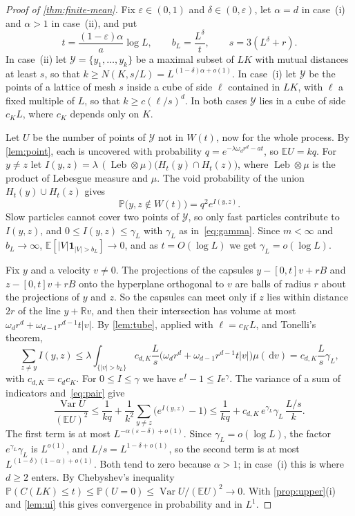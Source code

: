 \documentclass[11pt,a4paper]{article}
\numberwithin{equation}{section}
\theoremstyle{definition}
\theoremstyle{remark}
\newcommand{\E}{\mathbb E}
\newcommand{\Pp}{\mathbb P}
\newcommand{\R}{\mathbb R}
\newcommand{\ind}{\mathbf 1}
\newcommand{\dd}{\,\mathrm d}
\newcommand{\Leb}{\operatorname{Leb}}
\newcommand{\abs}[1]{\lvert#1\rvert}
\begin{document}
\begin{proof}[Proof of \cref{thm:finite-mean}]
Fix $\varepsilon\in(0,1)$ and $\delta\in(0,\varepsilon)$, let $\alpha=d$ in
case~(i) and $\alpha>1$ in case~(ii), and put
\[
t=\frac{(1-\varepsilon)\alpha}{a}\log L,\qquad b_L=\frac{L^\delta}{t},\qquad
s=3(L^\delta+r).
\]
In case~(ii) let $\mathcal Y=\{y_1,\dots,y_k\}$ be a maximal subset of $LK$
with mutual distances at least $s$, so that
$k\ge N(K,s/L)=L^{(1-\delta)\alpha+o(1)}$. In case~(i) let $\mathcal Y$ be the
points of a lattice of mesh $s$ inside a cube of side $\ell$ contained in
$LK$, with $\ell$ a fixed multiple of $L$, so that $k\ge c(\ell/s)^d$. In
both cases $\mathcal Y$ lies in a cube of side $c_KL$, where $c_K$ depends
only on $K$.

Let $U$ be the number of points of $\mathcal Y$ not in $W(t)$, now for the
whole process. By \cref{lem:point}, each is uncovered with probability
$q=e^{-\lambda\omega_dr^d-at}$, so $\E U=kq$. For $y\ne z$ let
$I(y,z)=\lambda\,(\Leb\otimes\mu)\bigl(H_t(y)\cap H_t(z)\bigr)$, where
$\Leb\otimes\mu$ is the product of Lebesgue measure and $\mu$. The void
probability of the union $H_t(y)\cup H_t(z)$ gives
\begin{equation}\label{eq:pair}
\Pp\bigl(y,z\notin W(t)\bigr)=q^2e^{I(y,z)}.
\end{equation}
Slow particles cannot cover two points of $\mathcal Y$, so only fast particles
contribute to $I(y,z)$, and $0\le I(y,z)\le\gamma_L$ with $\gamma_L$ as
in~\eqref{eq:gamma}. Since $m<\infty$ and $b_L\to\infty$,
$\E[\abs V\ind_{\abs V>b_L}]\to0$, and as $t=O(\log L)$ we get
$\gamma_L=o(\log L)$.

Fix $y$ and a velocity $v\ne0$. The projections of the capsules
$y-[0,t]v+rB$ and $z-[0,t]v+rB$ onto the hyperplane orthogonal to $v$ are
balls of radius $r$ about the projections of $y$ and $z$. So the capsules can
meet only if $z$ lies within distance $2r$ of the line $y+\R v$, and then
their intersection has volume at most $\omega_dr^d+\omega_{d-1}r^{d-1}t\abs v$.
By \cref{lem:tube}, applied with $\ell=c_KL$, and Tonelli's theorem,
\[
\sum_{z\ne y}I(y,z)\le\lambda\int_{\{\abs v>b_L\}}c_{d,K}\frac{L}{s}
\bigl(\omega_dr^d+\omega_{d-1}r^{d-1}t\abs v\bigr)\mu(\dd v)
=c_{d,K}\frac{L}{s}\gamma_L,
\]
with $c_{d,K}=c_dc_K$. For $0\le I\le\gamma$ we have $e^I-1\le Ie^\gamma$.
The variance of a sum of indicators and~\eqref{eq:pair} give
\[
\frac{\operatorname{Var}U}{(\E U)^2}
\le\frac1{kq}+\frac1{k^2}\sum_{y\ne z}\bigl(e^{I(y,z)}-1\bigr)
\le\frac1{kq}+c_{d,K}\,e^{\gamma_L}\gamma_L\,\frac{L/s}{k}.
\]
The first term is at most $L^{-\alpha(\varepsilon-\delta)+o(1)}$. Since
$\gamma_L=o(\log L)$, the factor $e^{\gamma_L}\gamma_L$ is $L^{o(1)}$, and
$L/s=L^{1-\delta+o(1)}$, so the second term is at most
$L^{(1-\delta)(1-\alpha)+o(1)}$. Both tend to zero because $\alpha>1$; in
case~(i) this is where $d\ge2$ enters. By Chebyshev's inequality
$\Pp(C(LK)\le t)\le\Pp(U=0)\le\operatorname{Var}U/(\E U)^2\to0$. With
\cref{prop:upper}(i) and \cref{lem:ui} this gives convergence in probability
and in $L^1$.


\end{proof}
\end{document}
